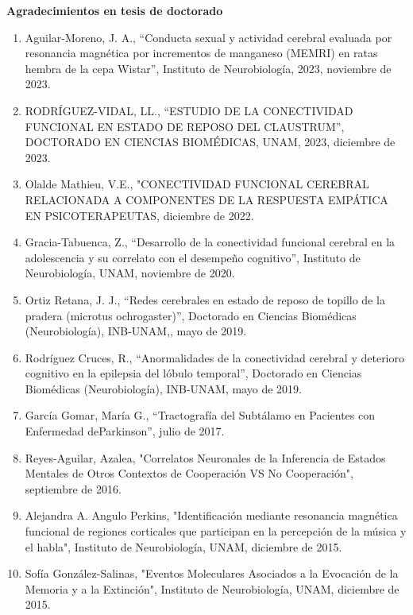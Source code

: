 \textbf{\color{red}Agradecimientos en tesis de doctorado}

\begin{enumerate}
\item Aguilar-Moreno, J. A., “Conducta sexual y actividad cerebral evaluada por resonancia magnética por incrementos de manganeso (MEMRI) en ratas hembra de 
la 
cepa Wistar”, Instituto de Neurobiología, 2023,  noviembre de 2023.

\item RODRÍGUEZ-VIDAL, LL., “ESTUDIO DE LA CONECTIVIDAD FUNCIONAL EN ESTADO DE REPOSO DEL CLAUSTRUM”, DOCTORADO EN CIENCIAS BIOMÉDICAS, UNAM, 2023,  
diciembre de 
2023.

\item Olalde Mathieu, V.E., "CONECTIVIDAD FUNCIONAL CEREBRAL RELACIONADA A COMPONENTES DE LA RESPUESTA EMPÁTICA EN PSICOTERAPEUTAS,  diciembre de 2022.

\item Gracia-Tabuenca, Z., “Desarrollo de la conectividad funcional cerebral en la adolescencia y su correlato con el desempeño cognitivo”, Instituto de 
Neurobiología, UNAM,  noviembre de 2020.

\item Ortiz Retana, J. J., “Redes cerebrales en estado de reposo de topillo de la pradera (microtus ochrogaster)”, Doctorado en Ciencias Biomédicas 
(Neurobiología), INB-UNAM,,  mayo de 2019.

\item Rodríguez Cruces, R., “Anormalidades de la conectividad cerebral y deterioro cognitivo en la epilepsia del lóbulo temporal”, Doctorado en Ciencias 
Biomédicas (Neurobiología), INB-UNAM,  mayo de 2019.

\item García Gomar, María G., “Tractografía del Subtálamo en Pacientes con Enfermedad deParkinson”,  julio de 2017.

\item Reyes-Aguilar, Azalea, "Correlatos Neuronales de la Inferencia de Estados Mentales de Otros Contextos de Cooperación VS No Cooperación",  septiembre 
de 
2016.

\item Alejandra A. Angulo Perkins, "Identificación mediante resonancia magnética funcional de regiones corticales que participan en la percepción de la 
música y 
el habla", Instituto de Neurobiología, UNAM,  diciembre de 2015.

\item Sofía González-Salinas, "Eventos Moleculares Asociados a la Evocación de la Memoria y a la Extinción", Instituto de Neurobiología, UNAM,  diciembre de 
2015.


\end{enumerate}
